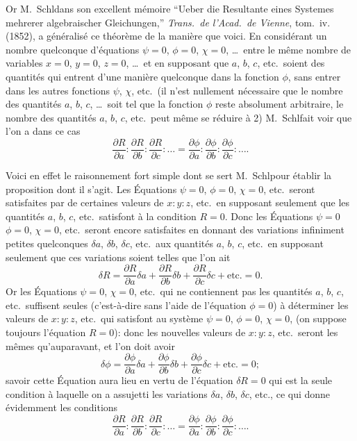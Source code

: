 \documentclass[11pt,a4paper]{book}
\begin{document}
Or M.~Schl\afli dans son excellent m\'{e}moire ``Ueber die Resultante eines Systemes mehrerer algebraischer Gleichungen,'' \textit{Trans.\ de l'Acad.\ de Vienne}, tom.~iv. (1852), a g\'{e}n\'{e}ralis\'{e} ce th\'{e}or\`{e}me de la mani\`{e}re que voici. En consid\'{e}rant un nombre quelconque d'\'{e}quations $\psi=0$, $\phi=0$, $\chi=0$, \ldots\ entre le m\^{e}me nombre de variables $x=0$, $y=0$, $z=0$, \ldots\ et en supposant que $a$, $b$, $c$, etc.\ soient des quantit\'{e}s qui entrent d'une mani\`{e}re quelconque dans la fonction $\phi$, sans entrer dans les autres fonctions $\psi$, $\chi$, etc.\ (il n'est nullement n\'{e}cessaire que le nombre des quantit\'{e}s $a$, $b$, $c$, \ldots\ soit tel que la fonction $\phi$ reste absolument arbitraire, le nombre des quantit\'{e}s $a$, $b$, $c$, etc.\ peut m\^{e}me se r\'{e}duire \`{a} 2) M.~Schl\afli fait voir que l'on a dans ce cas
\[
\frac{\partial R}{\partial a}:\frac{\partial R}{\partial b}:\frac{\partial R}{\partial c}:\ldots
=\frac{\partial\phi}{\partial a}:\frac{\partial\phi}{\partial b}:\frac{\partial\phi}{\partial c}:\ldots.
\]

Voici en effet le raisonnement fort simple dont se sert M.~Schl\afli pour \'{e}tablir la proposition dont il s'agit. Les \'{E}quations $\psi=0$, $\phi=0$, $\chi=0$, etc.\ seront satisfaites par de certaines valeurs de $x:y:z$, etc.\ en supposant seulement que les quantit\'{e}s $a$, $b$, $c$, etc.\ satisfont \`{a} la condition $R=0$. Donc les \'{E}quations $\psi=0$ $\phi=0$, $\chi=0$, etc.\ seront encore satisfaites en donnant des variations infiniment petites quelconques $\delta a$, $\delta b$, $\delta c$, etc.\ aux quantit\'{e}s $a$, $b$, $c$, etc.\ en supposant seulement que ces variations soient telles que l'on ait
\[
\delta R=\frac{\partial R}{\partial a}\delta a+\frac{\partial R}{\partial b}\delta b+\frac{\partial R}{\partial c}\delta c+\text{etc.}=0.
\]
Or les \'{E}quations $\psi=0$, $\chi=0$, etc.\ qui ne contiennent pas les quantit\'{e}s $a$, $b$, $c$, etc.\ suffisent seules (c'est-\`{a}-dire sans l'aide de l'\'{e}quation $\phi=0$) \`{a} d\'{e}terminer les valeurs de $x:y:z$, etc.\ qui satisfont au syst\`{e}me $\psi=0$, $\phi=0$, $\chi=0$, (on suppose toujours l'\'{e}quation $R=0$): donc les nouvelles valeurs de $x:y:z$, etc.\ seront les m\^{e}mes qu'auparavant, et l'on doit avoir
\[
\delta\phi=\frac{\partial\phi}{\partial a}\delta a+\frac{\partial\phi}{\partial b}\delta b+\frac{\partial\phi}{\partial c}\delta c+\text{etc.}=0;
\]
savoir cette \'{E}quation aura lieu en vertu de l'\'{e}quation $\delta R=0$ qui est la seule condition \`{a} laquelle on a assujetti les variations $\delta a$, $\delta b$, $\delta c$, etc., ce qui donne \'{e}videmment les conditions
\[
\frac{\partial R}{\partial a}:\frac{\partial R}{\partial b}:\frac{\partial R}{\partial c}:\ldots
=\frac{\partial\phi}{\partial a}:\frac{\partial\phi}{\partial b}:\frac{\partial\phi}{\partial c}:\ldots.
\]
\end{document}
